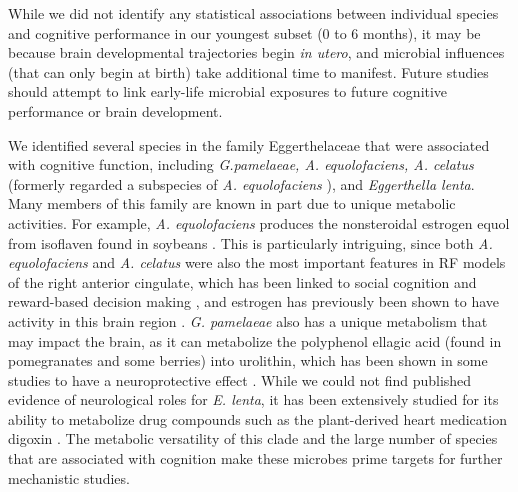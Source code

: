 \documentclass{article}
\begin{document}
While we did not identify any statistical associations between individual species
and cognitive performance in our youngest subset (0 to 6 months),
it may be because brain developmental trajectories begin \textit{in utero},
and microbial influences (that can only begin at birth)
take additional time to manifest.
Future studies should attempt to link early-life microbial exposures
to future cognitive performance or brain development.

We identified several species in the family Eggerthelaceae that were
associated with cognitive function, including \emph{G.pamelaeae, A. equolofaciens, A. celatus}
(formerly regarded a subspecies of \emph{A. equolofaciens}
\cite{takahashiCompleteGenomeSequence2021}),
and \emph{Eggerthella lenta}. Many members of this family are
known in part due to unique metabolic activities. For example, \emph{A.
equolofaciens} produces the nonsteroidal estrogen equol from isoflaven
found in soybeans \cite{wangEnantioselectiveSynthesisSEquol2005}.
This is particularly intriguing, since both \emph{A. equolofaciens} and \emph{A. celatus}
were also the most important features in RF models of the
right anterior cingulate, which has been linked to social cognition
and reward-based decision making \cite{appsAnteriorCingulateGyrus2016,boesRightAnteriorCingulate2008,bushDorsalAnteriorCingulate2002},
and estrogen has previously been shown to have activity 
in this brain region \cite{xiaoEstrogenAnteriorCingulate2013}.
\emph{G. pamelaeae} also has a unique metabolism that may impact the brain,
as it can metabolize the polyphenol ellagic acid
(found in pomegranates and some berries) into urolithin, which has been
shown in some studies to have a neuroprotective effect
\cite{gongUrolithinAlleviatesBloodbrain2022,selmaDescriptionUrolithinProduction2014}.
While we could not find published evidence of neurological roles for \emph{E. lenta},
it has been extensively studied for
its ability to metabolize drug compounds such as the plant-derived heart
medication digoxin \cite{haiserPredictingManipulatingCardiac2013}.
The metabolic versatility of this clade and the large number of
species that are associated with cognition make these microbes prime
targets for further mechanistic studies.
\end{document}
